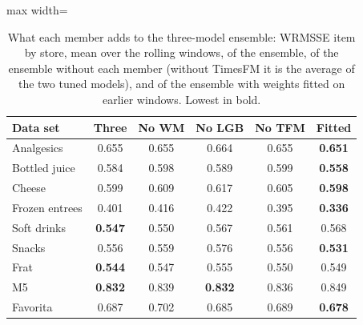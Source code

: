 \begin{table}[t]
\centering\footnotesize\setlength{\tabcolsep}{3pt}
\caption{What each member adds to the three-model ensemble: WRMSSE item by store, mean over the rolling windows, of
the ensemble, of the ensemble without each member (without TimesFM it is the average of the two tuned models), and of
the ensemble with weights fitted on earlier windows. Lowest in bold.}
\label{tab:sup-ablation}
\begin{adjustbox}{max width=\columnwidth}\begin{tabular}{lccccc}
\toprule
Data set & Three & No WM & No LGB & No TFM & Fitted\\
\midrule
Analgesics & 0.655 & 0.655 & 0.664 & 0.655 & \textbf{0.651} \\
Bottled juice & 0.584 & 0.598 & 0.589 & 0.599 & \textbf{0.558} \\
Cheese & 0.599 & 0.609 & 0.617 & 0.605 & \textbf{0.598} \\
Frozen entrees & 0.401 & 0.416 & 0.422 & 0.395 & \textbf{0.336} \\
Soft drinks & \textbf{0.547} & 0.550 & 0.567 & 0.561 & 0.568 \\
Snacks & 0.556 & 0.559 & 0.576 & 0.556 & \textbf{0.531} \\
Frat & \textbf{0.544} & 0.547 & 0.555 & 0.550 & 0.549 \\
M5 & \textbf{0.832} & 0.839 & \textbf{0.832} & 0.836 & 0.849 \\
Favorita & 0.687 & 0.702 & 0.685 & 0.689 & \textbf{0.678} \\
\bottomrule
\end{tabular}\end{adjustbox}
\end{table}
